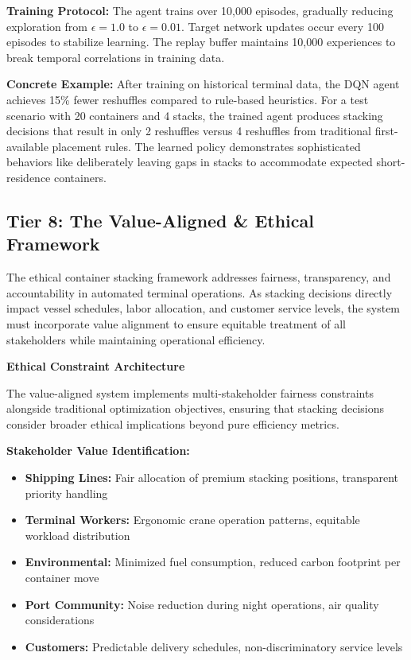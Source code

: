 \documentclass{article}
\begin{document}
\textbf{Training Protocol:} The agent trains over 10,000 episodes, gradually reducing exploration from \(\epsilon = 1.0\) to \(\epsilon = 0.01\). Target network updates occur every 100 episodes to stabilize learning. The replay buffer maintains 10,000 experiences to break temporal correlations in training data.

\textbf{Concrete Example:} After training on historical terminal data, the DQN agent achieves 15\% fewer reshuffles compared to rule-based heuristics. For a test scenario with 20 containers and 4 stacks, the trained agent produces stacking decisions that result in only 2 reshuffles versus 4 reshuffles from traditional first-available placement rules. The learned policy demonstrates sophisticated behaviors like deliberately leaving gaps in stacks to accommodate expected short-residence containers.

\subsection{Tier 8: The Value-Aligned \& Ethical Framework}

The ethical container stacking framework addresses fairness, transparency, and accountability in automated terminal operations. As stacking decisions directly impact vessel schedules, labor allocation, and customer service levels, the system must incorporate value alignment to ensure equitable treatment of all stakeholders while maintaining operational efficiency.

\textbf{Ethical Constraint Architecture}

The value-aligned system implements multi-stakeholder fairness constraints alongside traditional optimization objectives, ensuring that stacking decisions consider broader ethical implications beyond pure efficiency metrics.

\textbf{Stakeholder Value Identification:}
\begin{itemize}
\item \textbf{Shipping Lines:} Fair allocation of premium stacking positions, transparent priority handling
\item \textbf{Terminal Workers:} Ergonomic crane operation patterns, equitable workload distribution
\item \textbf{Environmental:} Minimized fuel consumption, reduced carbon footprint per container move
\item \textbf{Port Community:} Noise reduction during night operations, air quality considerations
\item \textbf{Customers:} Predictable delivery schedules, non-discriminatory service levels
\end{itemize}
\end{document}
